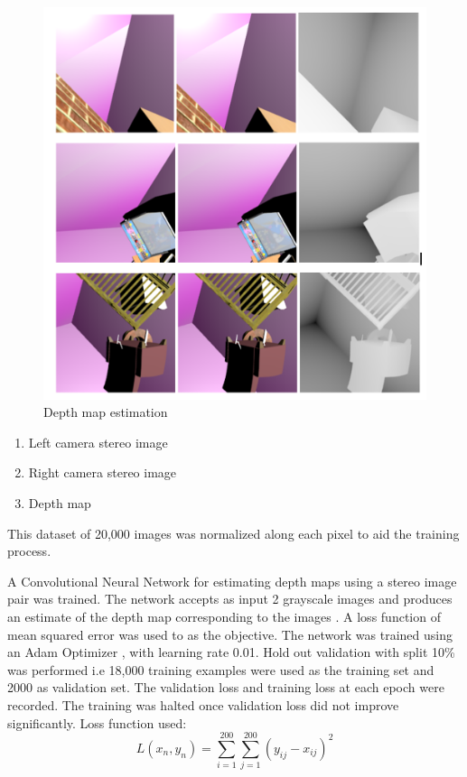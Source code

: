 \begin{figure}
  \includegraphics[width=\linewidth]{images/depthmap1.png}
  \caption{Depth map estimation}
  \label{fig:boat1}
\end{figure}

\begin{enumerate}
\item Left camera stereo image
\item Right camera stereo image
\item Depth map
\end{enumerate}
This dataset of 20,000 images was normalized along each pixel to aid the training process.

A Convolutional Neural Network for estimating depth maps using a stereo image pair was trained. The network accepts as input 2 grayscale images and produces an estimate of the depth map corresponding to the images \cite{MayerIHFCDB15} \cite{foucard_2016}.
A loss function of mean squared error was used to as the objective. The network was trained using an Adam Optimizer \cite{KingmaB14}, with learning rate 0.01. Hold out validation with split 10\%  was performed i.e 18,000 training examples were used as the training set and 2000 as validation set. The validation loss and training loss at each epoch were recorded. The training was halted once validation loss did not improve significantly.
Loss function used:
\[ L(x_n,y_n) = {\sum_{i=1}^{200}\sum_{j=1}^{200}} (y_{ij} - x_{ij})^2 \]

